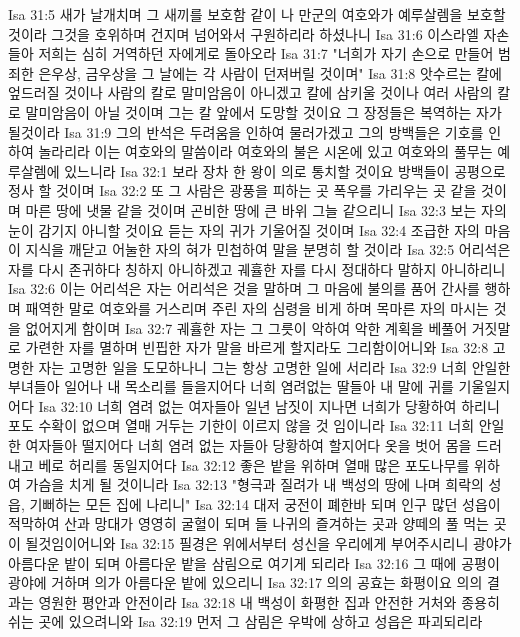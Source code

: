 Isa 31:5  새가 날개치며 그 새끼를 보호함 같이 나 만군의 여호와가 예루살렘을 보호할 것이라 그것을 호위하며 건지며 넘어와서 구원하리라 하셨나니
Isa 31:6  이스라엘 자손들아 저희는 심히 거역하던 자에게로 돌아오라
Isa 31:7  "너희가 자기 손으로 만들어 범죄한 은우상, 금우상을 그 날에는 각 사람이 던져버릴 것이며"
Isa 31:8  앗수르는 칼에 엎드러질 것이나 사람의 칼로 말미암음이 아니겠고 칼에 삼키울 것이나 여러 사람의 칼로 말미암음이 아닐 것이며 그는 칼 앞에서 도망할 것이요 그 장정들은 복역하는 자가 될것이라
Isa 31:9  그의 반석은 두려움을 인하여 물러가겠고 그의 방백들은 기호를 인하여 놀라리라 이는 여호와의 말씀이라 여호와의 불은 시온에 있고 여호와의 풀무는 예루살렘에 있느니라
Isa 32:1  보라 장차 한 왕이 의로 통치할 것이요 방백들이 공평으로 정사 할 것이며
Isa 32:2  또 그 사람은 광풍을 피하는 곳 폭우를 가리우는 곳 같을 것이며 마른 땅에 냇물 같을 것이며 곤비한 땅에 큰 바위 그늘 같으리니
Isa 32:3  보는 자의 눈이 감기지 아니할 것이요 듣는 자의 귀가 기울어질 것이며
Isa 32:4  조급한 자의 마음이 지식을 깨닫고 어눌한 자의 혀가 민첩하여 말을 분명히 할 것이라
Isa 32:5  어리석은 자를 다시 존귀하다 칭하지 아니하겠고 궤휼한 자를 다시 정대하다 말하지 아니하리니
Isa 32:6  이는 어리석은 자는 어리석은 것을 말하며 그 마음에 불의를 품어 간사를 행하며 패역한 말로 여호와를 거스리며 주린 자의 심령을 비게 하며 목마른 자의 마시는 것을 없어지게 함이며
Isa 32:7  궤휼한 자는 그 그릇이 악하여 악한 계획을 베풀어 거짓말로 가련한 자를 멸하며 빈핍한 자가 말을 바르게 할지라도 그리함이어니와
Isa 32:8  고명한 자는 고명한 일을 도모하나니 그는 항상 고명한 일에 서리라
Isa 32:9  너희 안일한 부녀들아 일어나 내 목소리를 들을지어다 너희 염려없는 딸들아 내 말에 귀를 기울일지어다
Isa 32:10  너희 염려 없는 여자들아 일년 남짓이 지나면 너희가 당황하여 하리니 포도 수확이 없으며 열매 거두는 기한이 이르지 않을 것 임이니라
Isa 32:11  너희 안일한 여자들아 떨지어다 너희 염려 없는 자들아 당황하여 할지어다 옷을 벗어 몸을 드러내고 베로 허리를 동일지어다
Isa 32:12  좋은 밭을 위하며 열매 많은 포도나무를 위하여 가슴을 치게 될 것이니라
Isa 32:13  "형극과 질려가 내 백성의 땅에 나며 희락의 성읍, 기뻐하는 모든 집에 나리니"
Isa 32:14  대저 궁전이 폐한바 되며 인구 많던 성읍이 적막하여 산과 망대가 영영히 굴혈이 되며 들 나귀의 즐겨하는 곳과 양떼의 풀 먹는 곳이 될것임이어니와
Isa 32:15  필경은 위에서부터 성신을 우리에게 부어주시리니 광야가 아름다운 밭이 되며 아름다운 밭을 삼림으로 여기게 되리라
Isa 32:16  그 때에 공평이 광야에 거하며 의가 아름다운 밭에 있으리니
Isa 32:17  의의 공효는 화평이요 의의 결과는 영원한 평안과 안전이라
Isa 32:18  내 백성이 화평한 집과 안전한 거처와 종용히 쉬는 곳에 있으려니와
Isa 32:19  먼저 그 삼림은 우박에 상하고 성읍은 파괴되리라
